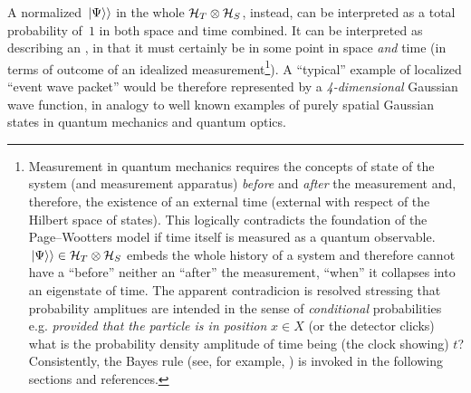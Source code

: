 A normalized $\left.\left| \Psi \right\rangle\right\rangle$ in the whole $\mathcal{H}_T \otimes \mathcal{H}_S$,
instead,
can be interpreted as a total probability of~$1$ in both space and time combined.
It can be interpreted as describing an ,
in that it
must certainly be in some point in space
\emph{and} time (in terms of outcome of an idealized measurement\footnote{
  Measurement in quantum mechanics requires the concepts
  of state of the system
  (and measurement apparatus)
  \emph{before} and \emph{after} the measurement and, therefore, the existence
  of an external time (external with respect of the Hilbert space of states).
  This logically contradicts the foundation of the Page--Wootters model if
  time itself is measured as a quantum observable. $\left.\left| \Psi \right\rangle\right\rangle \in \mathcal{H}_T \otimes \mathcal{H}_S$
  embeds the whole history of a system and therefore cannot have a
  ``before'' neither an ``after'' the measurement, ``when'' it collapses
  into an eigenstate of time. The apparent contradicion is resolved
  stressing that probability amplitues are intended in the sense of
  \emph{conditional} probabilities e.g. \emph{provided that the particle
  is in position} $x \in X$ (or the detector clicks)
  what is the probability density amplitude of time being (the clock showing) $t$?
  Consistently, the Bayes rule
  (see, for example, \cite{Stat:Conditional})
  is invoked in the following sections
  and references.
}).
A ``typical'' example of localized ``event wave packet'' would be
therefore represented by
a \emph{4\nobreakdash-dimensional} Gaussian wave function, %
in analogy to well known examples of purely spatial Gaussian states
in quantum mechanics and quantum optics.

